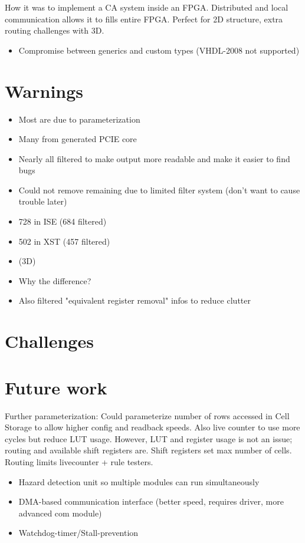 \TODO
How it was to implement a CA system inside an FPGA.
Distributed and local communication allows it to fills entire FPGA.
Perfect for 2D structure, extra routing challenges with 3D.

\begin{itemize}
    \item Compromise between generics and custom types (VHDL-2008 not supported)
\end{itemize}

\section{Warnings}

\begin{itemize}
    \item Most are due to parameterization
    \item Many from generated PCIE core
    \item Nearly all filtered to make output more readable and make it easier to find bugs
    \item Could not remove remaining due to limited filter system (don't want to cause trouble later)
    \item 728 in ISE (684 filtered)
    \item 502 in XST (457 filtered)
    \item (3D)
    \item Why the difference?
    \item Also filtered "equivalent register removal" infos to reduce clutter
\end{itemize}

\section{Challenges}
\label{sec:challenges}

\TODO

\section{Future work}

\TODO

Further parameterization:
Could parameterize number of rows accessed in Cell Storage to allow higher config and readback speeds.
Also live counter to use more cycles but reduce LUT usage.
However, LUT and register usage is not an issue; routing and available shift registers are.
Shift registers set max number of cells.
Routing limits livecounter + rule testers.

\begin{itemize}
    \item Hazard detection unit so multiple modules can run simultaneously
    \item DMA-based communication interface (better speed, requires driver, more advanced com module)
    \item Watchdog-timer/Stall-prevention
\end{itemize}
